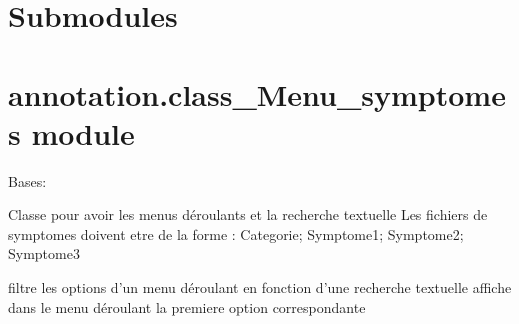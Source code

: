 \documentclass[letterpaper,10pt,english]{sphinxmanual}
\begin{document}
\section{Submodules}
\label{\detokenize{annotation:submodules}}

\section{annotation.class\_Menu\_symptomes module}
\label{\detokenize{annotation:module-annotation.class_Menu_symptomes}}\label{\detokenize{annotation:annotation-class-menu-symptomes-module}}

\begin{fulllineitems}
\label{\detokenize{annotation:annotation.class_Menu_symptomes.MenuSymptomes}}
\pysigstartsignatures
{}
\pysigstopsignatures
\sphinxAtStartPar
Bases: 

\sphinxAtStartPar
Classe pour avoir les menus déroulants et la recherche textuelle
Les fichiers de symptomes doivent etre de la forme : Categorie; Symptome1; Symptome2; Symptome3

\begin{fulllineitems}
\label{\detokenize{annotation:annotation.class_Menu_symptomes.MenuSymptomes.filtrer_options}}
\pysigstartsignatures
{}
\pysigstopsignatures
\sphinxAtStartPar
filtre les options d’un menu déroulant en fonction d’une recherche textuelle
affiche dans le menu déroulant la premiere option correspondante

\end{fulllineitems}


\end{fulllineitems}
\end{document}
